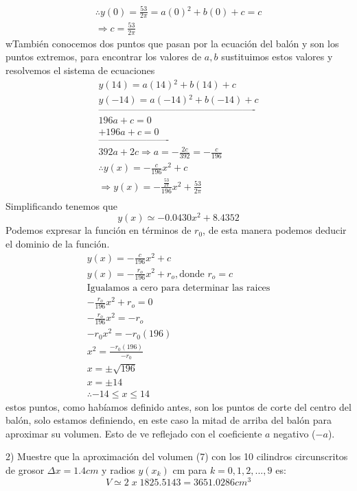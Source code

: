 \begin{gather*}
\therefore y(0)=\frac{53}{2\pi}=a(0){^2}+b(0)+c=c\\
\Rightarrow c=\frac{53}{2\pi}
\end{gather*}
wTambién conocemos dos puntos que pasan por la ecuación del balón y son los puntos extremos, para encontrar los valores de $a,b$ sustituimos estos valores y resolvemos el sistema de ecuaciones
\begin{gather*}
y(14)=a(14){^2}+b(14)+c\\
y(-14)=a(-14){^2}+b(-14)+c\\
\text{-------------------------------------------------}\\
196a+c=0\\
+196a+c=0\\
\text{----------------------}\\
392a+2c\Rightarrow a=-\frac{2c}{392}=-\frac{c}{196}\\
\therefore y(x)=-\frac{c}{196}x{^2}+c\\
\Rightarrow y(x)=-\frac{\frac{53}{2\pi}}{196}x{^2}+\frac{53}{2\pi}\\
\end{gather*}
Simplificando tenemos que $$y(x)\simeq-0.0430x{^2}+8.4352$$
Podemos expresar la función en términos de $r_0$, de esta manera podemos deducir el dominio de la función.
\begin{gather*}
y(x)=-\frac{c}{196}x{^2}+c\\
y(x)=-\frac{r_{o}}{196}x{^2}+r_{o},\text{donde }r_o=c\\
\text{Igualamos a cero para determinar las raices}\\
-\frac{r_{o}}{196}x{^2}+r_{o}=0\\
-\frac{r_{o}}{196}x{^2}=-r_{o}\\
-r_{0}x{^2}=-r_{0}(196)\\
x{^2}=\frac{-r_{0}(196)}{-r_{0}}\\
x=\pm \sqrt{196}\\
x=\pm 14\\
\therefore-14\leq x\leq 14
\end{gather*}
estos puntos, como habíamos definido antes, son los puntos de corte del centro del balón, solo estamos definiendo, en este caso la mitad de arriba del balón para aproximar su volumen. Esto de ve reflejado con el coeficiente $a$ negativo ($-a$).

2) Muestre que la aproximación del volumen (7) con los 10 cilindros circunscritos de grosor $\Delta x = 1.4 cm$ y radios $y(x_{k})$ cm para $k = 0, 1, 2, . . . , 9$ es:
$$V\simeq 2 \; x \;1825.5143=3651.0286 cm^3$$

